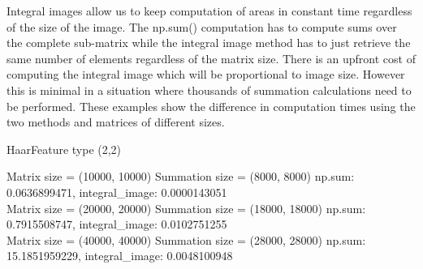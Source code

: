 
Integral images allow us to keep computation of areas in constant time regardless of the size of the image. The np.sum() computation has to compute sums over the complete sub-matrix while the integral image method has to just retrieve the same number of elements regardless of the matrix size.
There is an upfront cost of computing the integral image which will be proportional to image size. However this is minimal in a situation where thousands of summation calculations need to be performed. These examples show the difference in computation times using the two methods and matrices of different sizes.

HaarFeature type (2,2)

Matrix size = (10000, 10000) Summation size = (8000, 8000) np.sum: 0.0636899471, integral\_image: 0.0000143051\\
Matrix size = (20000, 20000) Summation size = (18000, 18000) np.sum: 0.7915508747, integral\_image: 0.0102751255\\
Matrix size = (40000, 40000) Summation size = (28000, 28000) np.sum: 15.1851959229, integral\_image: 0.0048100948\\